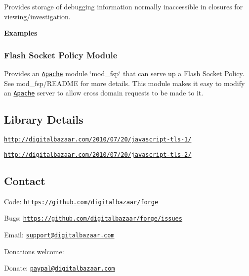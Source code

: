Provides storage of debugging information normally inaccessible in closures for viewing/investigation.

{\bfseries Examples}


\begin{DoxyCode}
\end{DoxyCode}


\label{_fsp}%
 \subsubsection*{Flash Socket Policy Module}

Provides an \href{http://httpd.apache.org/}{\tt Apache} module \char`\"{}mod\+\_\+fsp\char`\"{} that can serve up a Flash Socket Policy. See {\ttfamily mod\+\_\+fsp/\+R\+E\+A\+D\+ME} for more details. This module makes it easy to modify an \href{http://httpd.apache.org/}{\tt Apache} server to allow cross domain requests to be made to it.

\subsection*{Library Details }


\begin{DoxyItemize}
\item \href{http://digitalbazaar.com/2010/07/20/javascript-tls-1/}{\tt http\+://digitalbazaar.\+com/2010/07/20/javascript-\/tls-\/1/}
\item \href{http://digitalbazaar.com/2010/07/20/javascript-tls-2/}{\tt http\+://digitalbazaar.\+com/2010/07/20/javascript-\/tls-\/2/}
\end{DoxyItemize}

\subsection*{Contact }


\begin{DoxyItemize}
\item Code\+: \href{https://github.com/digitalbazaar/forge}{\tt https\+://github.\+com/digitalbazaar/forge}
\item Bugs\+: \href{https://github.com/digitalbazaar/forge/issues}{\tt https\+://github.\+com/digitalbazaar/forge/issues}
\item Email\+: \href{mailto:support@digitalbazaar.com}{\tt support@digitalbazaar.\+com}
\end{DoxyItemize}

Donations welcome\+:


\begin{DoxyItemize}
\item Donate\+: \href{mailto:paypal@digitalbazaar.com}{\tt paypal@digitalbazaar.\+com} 
\end{DoxyItemize}